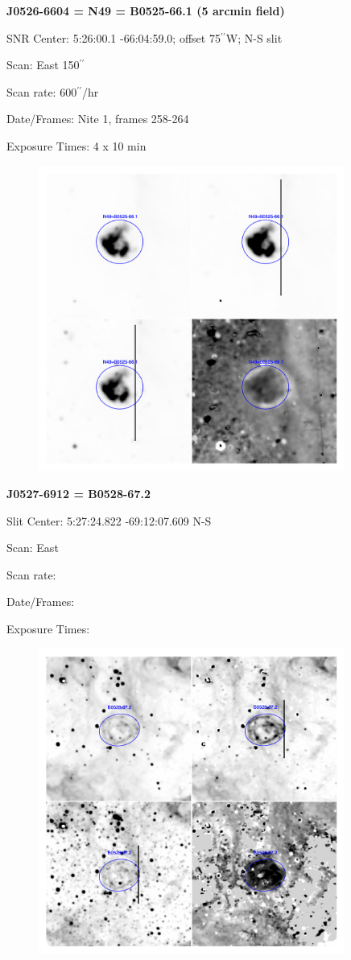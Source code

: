 \documentclass[11pt]{article}
\newcommand{\arcsec}{$^{\prime\prime}$}
\begin{document}
\newpage
{\bf J0526-6604 = N49 = B0525-66.1 (5 arcmin field)}  
 
SNR Center:   5:26:00.1   -66:04:59.0;  offset 75\arcsec W;      N-S slit

Scan:  East   150\arcsec

Scan rate:    600\arcsec/hr

Date/Frames:  Nite 1, frames 258-264

Exposure Times:  4 x 10 min

\begin{figure}
\includegraphics[width=10.05cm]{snapshots/N49_5arcmin.png}
\end{figure}

\newpage
{\bf J0527-6912 = B0528-67.2}  
 
Slit Center:   5:27:24.822  -69:12:07.609 N-S

Scan:  East

Scan rate:  

Date/Frames:

Exposure Times:  

\begin{figure}
\includegraphics[width=10.05cm]{snapshots/B0528-672.png}
\end{figure}
\end{document}
